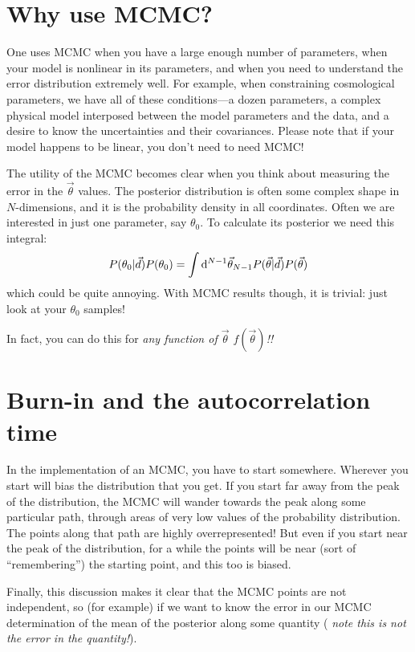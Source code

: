 \section{Why use MCMC?}

One uses MCMC when you have a large enough number of parameters, when
your model is nonlinear in its parameters, and when you need to
understand the error distribution extremely well. For example, when
constraining cosmological parameters, we have all of these
conditions---a dozen parameters, a complex physical model interposed
between the model parameters and the data, and a desire to know the
uncertainties and their covariances. Please note that if your model
happens to be linear, you don't need to need MCMC!

The utility of the MCMC becomes clear when you think about measuring
the error in the $\vec{\theta}$ values. The posterior distribution is
often some complex shape in $N$-dimensions, and it is the probability
density in all coordinates. Often we are interested in just one
parameter, say $\theta_0$. To calculate its posterior we need this
integral:
\begin{equation}
P(\theta_0 | \vec{d}) P(\theta_0) = \int {\rm
d}^{N-1}\vec{\theta}_{N-1} P(\vec{\theta} | \vec{d}) P(\vec{\theta})
\end{equation}
which could be quite annoying. With MCMC results though, it is
trivial: just look at your $\theta_0$ samples!

In fact, you can do this for {\it any function of $\vec{\theta}$
$f(\vec{\theta})$!!}

\section{Burn-in and the autocorrelation time}

In the implementation of an MCMC, you have to start
somewhere. Wherever you start will bias the distribution that you
get. If you start far away from the peak of the distribution, the MCMC
will wander towards the peak along some particular path, through areas
of very low values of the probability distribution. The points along
that path are highly overrepresented!  But even if you start near the
peak of the distribution, for a while the points will be near (sort of
``remembering'') the starting point, and this too is biased.

Finally, this discussion makes it clear that the MCMC points are not
independent, so (for example) if we want to know the error in our MCMC
determination of the mean of the posterior along some quantity ({\it
note this is not the error in the quantity!}).

